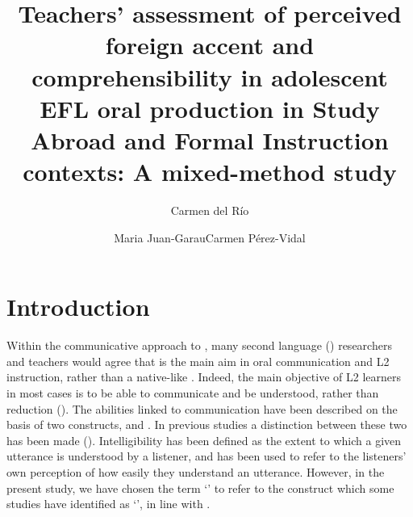 \documentclass[output=paper]{langsci/langscibook}
\author{Carmen del Río\affiliation{Universitat Pompeu Fabra}\and Maria Juan-Garau\affiliation{University of the Balearic Islands}\lastand Carmen Pérez-Vidal\affiliation{Universitat Pompeu Fabra}}
\title{Teachers’ assessment of perceived foreign accent and comprehensibility in adolescent EFL oral production in Study Abroad and Formal Instruction contexts: A mixed-method study}
\begin{document}
\section{Introduction}

Within the communicative approach to , many second language () researchers and teachers would agree that  is the main aim in oral communication and {L2}  instruction, rather than a native-like . Indeed, the main objective of {L2} learners in most cases is to be able to communicate and be understood, rather than  reduction (\citealt{PenningtonRichards1986,DerwingMunro1997,Jenkins2000,Munro2008}). The abilities linked to communication have been described on the basis of two constructs,  and . In previous studies a distinction between these two has been made (\citealt{MunroDerwing1995,MunroDerwing1999,DerwingMunro1997,DerwingMunro2009}). Intelligibility has been defined as the extent to which a given utterance is understood by a listener, and  has been used to refer to the listeners’ own perception of how easily they understand an utterance. However, in the present study, we have chosen the term ‘’ to refer to the construct which some studies have identified as ‘’, in line with \citet{IsaacsTrofimovich2012}.  
\end{document}
